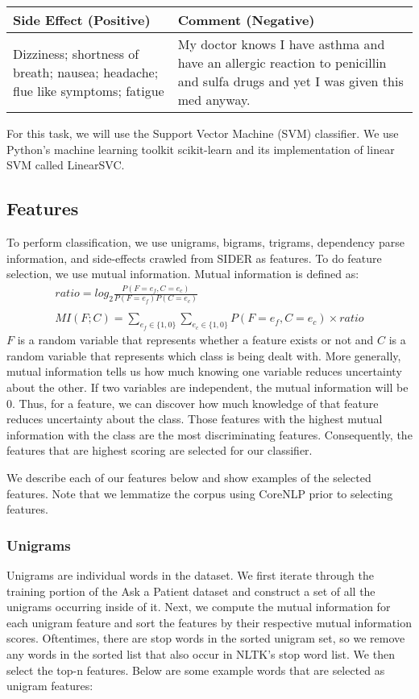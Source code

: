 \documentclass{acm_proc_article-sp}
\begin{document}
\begin{tabular}{| p{4cm} | p{4cm} |}
\hline
Side Effect (Positive) & Comment (Negative) \\ \hline
Dizziness; shortness of breath; nausea; headache; flue like symptoms; fatigue & My doctor knows I have asthma and have an allergic reaction to penicillin and sulfa drugs and yet I was given this med anyway. \\ \hline
\end{tabular} 

For this task, we will use the Support Vector Machine (SVM) classifier. We use Python's machine learning toolkit scikit-learn and its implementation of linear SVM called LinearSVC.

\subsection{Features}
To perform classification, we use unigrams, bigrams, trigrams, dependency parse information, and side-effects crawled from SIDER as features. To do feature selection, we use mutual information. Mutual information is defined as: 
\begin{gather*}
ratio = log_2 \frac{P(F=e_f,C=e_c)}{P(F=e_f)P(C=e_c)} \\ \\
MI(F;C) = \sum\limits_{e_f \in \{1,0\}} \sum\limits_{e_c \in \{1,0\}}P(F=e_f,C=e_c) \times ratio
\end{gather*}
$F$ is a random variable that represents whether a feature exists or not and $C$ is a random variable that represents which class is being dealt with. More generally, mutual information tells us how much knowing one variable reduces uncertainty about the other. If two variables are independent, the mutual information will be 0. Thus, for a feature, we can discover how much knowledge of that feature reduces uncertainty about the class. Those features with the highest mutual information with the class are the most discriminating features. Consequently, the features that are highest scoring are selected for our classifier.

We describe each of our features below and show examples of the selected features. Note that we lemmatize the corpus using CoreNLP prior to selecting features.

\subsubsection{Unigrams}
Unigrams are individual words in the dataset. We first iterate through the training portion of the Ask a Patient dataset and construct a set of all the unigrams occurring inside of it. Next, we compute the mutual information for each unigram feature and sort the features by their respective mutual information scores. Oftentimes, there are stop words in the sorted unigram set, so we remove any words in the sorted list that also occur in NLTK's stop word list. We then select the top-n features. Below are some example words that are selected as unigram features: 
\end{document}
